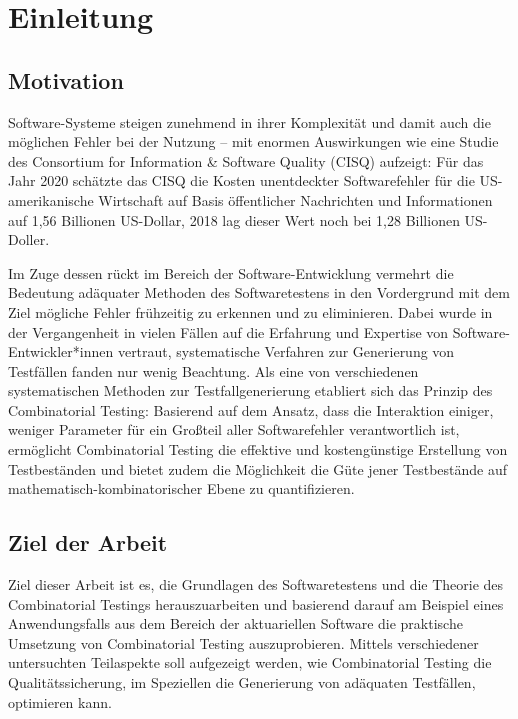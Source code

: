 \chapter{Einleitung}\label{chap:einleitung}

\section{Motivation}\label{sec:motivation}

Software-Systeme steigen zunehmend in ihrer Komplexität und damit auch die möglichen Fehler bei der Nutzung -- mit enormen Auswirkungen wie eine Studie des Consortium for Information \& Software Quality (CISQ) \cite{krasner2021cost} aufzeigt: Für das Jahr 2020 schätzte das CISQ die Kosten unentdeckter Softwarefehler für die US-amerikanische Wirtschaft auf Basis öffentlicher Nachrichten und Informationen auf 1,56 Billionen US-Dollar, 2018 lag dieser Wert noch bei 1,28 Billionen US-Doller.

Im Zuge dessen rückt im Bereich der Software-Entwicklung vermehrt die Bedeutung adäquater Methoden des Softwaretestens in den Vordergrund mit dem Ziel mögliche Fehler frühzeitig zu erkennen und zu eliminieren. Dabei wurde in der Vergangenheit in vielen Fällen auf die Erfahrung und Expertise von Software-Entwickler*innen vertraut, systematische Verfahren zur Generierung von Testfällen fanden nur wenig Beachtung. Als eine von verschiedenen systematischen Methoden zur Testfallgenerierung etabliert sich das Prinzip des Combinatorial Testing: Basierend auf dem Ansatz, dass die Interaktion einiger, weniger Parameter für ein Großteil aller Softwarefehler verantwortlich ist, ermöglicht Combinatorial Testing die effektive und kostengünstige Erstellung von Testbeständen und bietet zudem die Möglichkeit die Güte jener Testbestände auf mathematisch-kombinatorischer Ebene zu quantifizieren.

\section{Ziel der Arbeit}\label{sec:zielderArbeit}

Ziel dieser Arbeit ist es, die Grundlagen des Softwaretestens und die Theorie des Combinatorial Testings herauszuarbeiten und basierend darauf am Beispiel eines Anwendungsfalls aus dem Bereich der aktuariellen Software die praktische Umsetzung von Combinatorial Testing auszuprobieren. Mittels verschiedener untersuchten Teilaspekte soll aufgezeigt werden, wie Combinatorial Testing die Qualitätssicherung, im Speziellen die Generierung von adäquaten Testfällen, optimieren kann.

